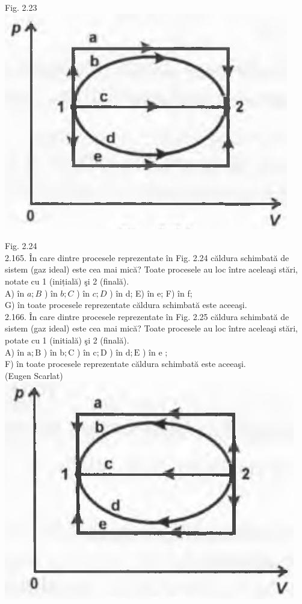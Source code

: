 \documentclass[10pt]{article}
\begin{document}
Fig. 2.23\\
\includegraphics[max width=\textwidth, center]{2025_07_01_5b3ff9fa0d508c8e9f17g-110(1)}

Fig. 2.24\\
2.165. În care dintre procesele reprezentate în Fig. 2.24 căldura schimbată de sistem (gaz ideal) este cea mai mică? Toate procesele au loc între aceleaşi stări, notate cu 1 (inițială) şi 2 (finală).\\
A) în $a ; B$ ) în $b ; C$ ) în $c ; D$ ) în d; E) în e; F) în f;\\
G) în toate procesele reprezentate căldura schimbată este aceeaşi.\\
2.166. În care dintre procesele reprezentate în Fig. 2.25 căldura schimbată de sistem (gaz ideal) este cea mai mică? Toate procesele au loc între aceleaşi stări, potate cu 1 (initială) şi 2 (finală).\\
A) în $\mathrm{a} ; \mathrm{B}$ ) în $\mathrm{b} ; \mathrm{C}$ ) în $\mathrm{c} ; \mathrm{D}$ ) în $\mathrm{d} ; \mathrm{E}$ ) în e ;\\
F) în toate procesele reprezentate căldura schimbată este aceeaşi.\\
(Eugen Scarlat)\\
\includegraphics[max width=\textwidth, center]{2025_07_01_5b3ff9fa0d508c8e9f17g-111}
\end{document}
